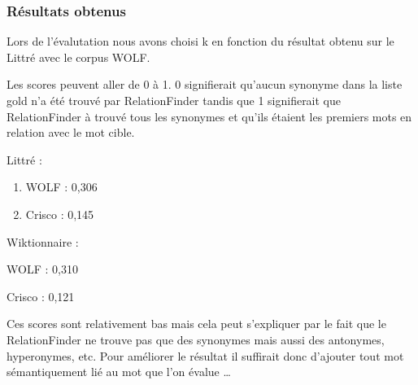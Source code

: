 \subsubsection{Résultats obtenus}

Lors de l'évalutation nous avons choisi k en fonction du résultat obtenu sur 
le Littré avec le corpus WOLF.

Les scores peuvent aller de 0 à 1. 0 signifierait qu'aucun synonyme dans la 
liste gold n'a été trouvé par RelationFinder tandis que 1 signifierait que 
RelationFinder à trouvé tous les synonymes et qu'ils étaient les premiers mots 
en relation avec le mot cible.

\begin{enumerate}
 \item {Littré :
	\begin{enumerate}
	 \item WOLF :  0,306
	 \item Crisco : 0,145
	\end{enumerate}
	}
 \item {Wiktionnaire :
	\item WOLF : 0,310
	\item Crisco : 0,121
	}
\end{enumerate}

Ces scores sont relativement bas mais cela peut s'expliquer par le fait que le 
RelationFinder ne trouve pas que des synonymes mais aussi des antonymes, 
hyperonymes, etc. Pour améliorer le résultat il suffirait donc d'ajouter 
tout mot sémantiquement lié au mot que l'on évalue \dots 

